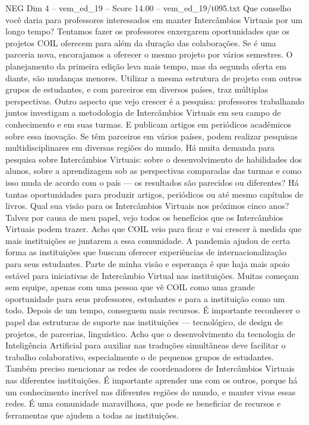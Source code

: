 \begin{textsample}{NEG Dim 4 – vem\_ed\_19 – Score 14.00 – vem\_ed\_19/t095.txt}
Que conselho você daria para professores interessados em manter Intercâmbios Virtuais por um longo tempo?
Tentamos fazer os professores enxergarem oportunidades que os projetos COIL oferecem para além da duração das colaborações.
Se é uma parceria nova, encorajamos a oferecer o mesmo projeto por vários semestres.
O planejamento da primeira edição leva mais tempo, mas da segunda oferta em diante, são mudanças menores.
Utilizar a mesma estrutura de projeto com outros grupos de estudantes, e com parceiros em diversos países, traz múltiplas perspectivas.
Outro aspecto que vejo crescer é a pesquisa: professores trabalhando juntos investigam a metodologia de Intercâmbios Virtuais em seu campo de conhecimento e em suas turmas.
E publicam artigos em periódicos acadêmicos sobre essa inovação.
Se têm parceiros em vários países, podem realizar pesquisas multidisciplinares em diversas regiões do mundo.
Há muita demanda para pesquisa sobre Intercâmbios Virtuais: sobre o desenvolvimento de habilidades dos alunos, sobre a aprendizagem sob as perspectivas comparadas das turmas e como isso muda de acordo com o país — os resultados são parecidos ou diferentes?
Há tantas oportunidades para produzir artigos, periódicos ou até mesmo capítulos de livros.
Qual sua visão para os Intercâmbios Virtuais nos próximos cinco anos?
Talvez por causa de meu papel, vejo todos os benefícios que os Intercâmbios Virtuais podem trazer.
Acho que COIL veio para ficar e vai crescer à medida que mais instituições se juntarem a essa comunidade.
A pandemia ajudou de certa forma as instituições que buscam oferecer experiências de internacionalização para seus estudantes.
Parte de minha visão e esperança é que haja mais apoio estável para iniciativas de Intercâmbio Virtual nas instituições.
Muitas começam sem equipe, apenas com uma pessoa que vê COIL como uma grande oportunidade para seus professores, estudantes e para a instituição como um todo.
Depois de um tempo, conseguem mais recursos.
É importante reconhecer o papel das estruturas de suporte nas instituições — tecnológico, de design de projetos, de parcerias, linguístico.
Acho que o desenvolvimento da tecnologia de Inteligência Artificial para auxiliar nas traduções simultâneas deve facilitar o trabalho colaborativo, especialmente o de pequenos grupos de estudantes.
Também preciso mencionar as redes de coordenadores de Intercâmbios Virtuais nas diferentes instituições.
É importante aprender uns com os outros, porque há um conhecimento incrível nas diferentes regiões do mundo, e manter vivas essas redes.
É uma comunidade maravilhosa, que pode se beneficiar de recursos e ferramentas que ajudem a todas as instituições.

\end{textsample}
